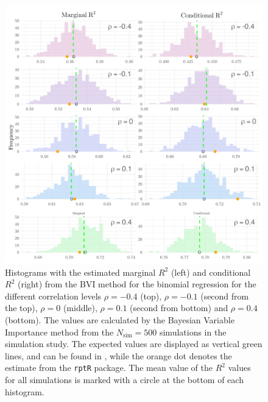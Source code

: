 \begin{figure}[H]
  \centering
  \includegraphics[width=1.1\linewidth]{Figures/Simulation study/R2_combined_logit.png}
  \caption{Histograms with the estimated marginal $R^2$ (left) and conditional $R^2$ (right) from the BVI method for the binomial regression for the different correlation levels $\rho=-0.4$ (top), $\rho=-0.1$ (second from the top), $\rho=0$ (middle), $\rho=0.1$ (second from bottom) and $\rho=0.4$ (bottom). The values are calculated by the Bayesian Variable Importance method from the $N_{\text{sim}}=500$ simulations in the simulation study. The expected values are displayed as vertical green lines, and can be found in , while the orange dot denotes the estimate from the \texttt{rptR} package. The mean value of the $R^2$ values for all simulations is marked with a circle at the bottom of each histogram.}
  \label{fig:r2_combined_logit}
\end{figure}





